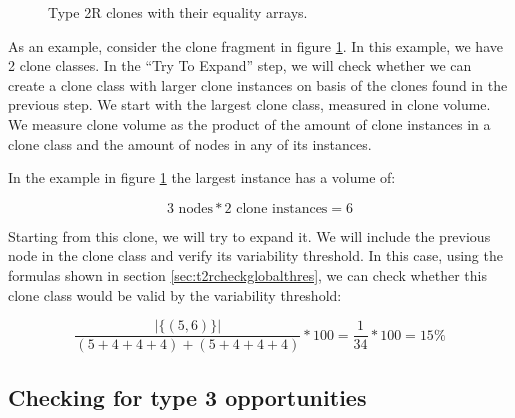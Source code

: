\begin{figure}[H]
\begin{parcolumns}{2}
\end{parcolumns}
\caption{Type 2R clones with their equality arrays.}
\label{fig:trytoexpand}
\end{figure}

As an example, consider the clone fragment in figure \ref{fig:trytoexpand}. In this example, we have 2 clone classes. In the ``Try To Expand'' step, we will check whether we can create a clone class with larger clone instances on basis of the clones found in the previous step. We start with the largest clone class, measured in clone volume. We measure clone volume as the product of the amount of clone instances in a clone class and the amount of nodes in any of its instances.

In the example in figure \ref{fig:trytoexpand} the largest instance has a volume of:

\begin{equation}\label{eq:clonevolume}
3 \text{ nodes} * 2 \text{ clone instances} = 6
\end{equation}

Starting from this clone, we will try to expand it. We will include the previous node in the clone class and verify its variability threshold. In this case, using the formulas shown in section \ref{sec:t2rcheckglobalthres}, we can check whether this clone class would be valid by the variability threshold:

\begin{equation}\label{eq:variabilitycombined}
\frac{|\{(5,6)\}|}{(5+4+4+4)+(5+4+4+4)}*100 = \frac{1}{34}*100 = 15\%
\end{equation}



\subsection{Checking for type 3 opportunities} \label{sec:t3rclonerefactor}

